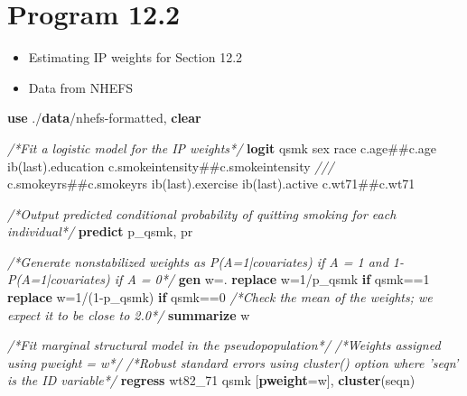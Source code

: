 \documentclass[
  10pt,
]{book}
\newenvironment{Shaded}{\begin{snugshade}}{\end{snugshade}}
\newcommand{\CommentTok}[1]{\textcolor[rgb]{0.56,0.35,0.01}{\textit{#1}}}
\newcommand{\FunctionTok}[1]{\textcolor[rgb]{0.00,0.00,0.00}{#1}}
\newcommand{\KeywordTok}[1]{\textcolor[rgb]{0.13,0.29,0.53}{\textbf{#1}}}
\newcommand{\NormalTok}[1]{#1}
\providecommand{\tightlist}{%
  \setlength{\itemsep}{0pt}\setlength{\parskip}{0pt}}
\begin{document}
\hypertarget{program-12.2}{%
\section{Program 12.2}\label{program-12.2}}

\begin{itemize}
\tightlist
\item
  Estimating IP weights for Section 12.2
\item
  Data from NHEFS
\end{itemize}

\begin{Shaded}
\begin{Highlighting}[]
\KeywordTok{use}\NormalTok{ ./}\KeywordTok{data}\NormalTok{/nhefs-formatted, }\KeywordTok{clear}

\CommentTok{/*Fit a logistic model for the IP weights*/} 
\KeywordTok{logit}\NormalTok{ qsmk sex race c.age##c.age ib(}\FunctionTok{last}\NormalTok{).education c.smokeintensity##c.smokeintensity }\CommentTok{///}
\NormalTok{c.smokeyrs##c.smokeyrs ib(}\FunctionTok{last}\NormalTok{).exercise ib(}\FunctionTok{last}\NormalTok{).active c.wt71##c.wt71 }

\CommentTok{/*Output predicted conditional probability of quitting smoking for each individual*/}
\KeywordTok{predict}\NormalTok{ p_qsmk, pr}

\CommentTok{/*Generate nonstabilized weights as P(A=1|covariates) if A = 1 and 1-P(A=1|covariates) if A = 0*/}
\KeywordTok{gen} \FunctionTok{w}\NormalTok{=.}
\KeywordTok{replace} \FunctionTok{w}\NormalTok{=1/p_qsmk }\KeywordTok{if}\NormalTok{ qsmk==1}
\KeywordTok{replace} \FunctionTok{w}\NormalTok{=1/(1-p_qsmk) }\KeywordTok{if}\NormalTok{ qsmk==0}
\CommentTok{/*Check the mean of the weights; we expect it to be close to 2.0*/}
\KeywordTok{summarize} \FunctionTok{w}

\CommentTok{/*Fit marginal structural model in the pseudopopulation*/}
\CommentTok{/*Weights assigned using pweight = w*/}
\CommentTok{/*Robust standard errors using cluster() option where 'seqn' is the ID variable*/}
\KeywordTok{regress}\NormalTok{ wt82_71 qsmk [}\KeywordTok{pweight}\NormalTok{=}\FunctionTok{w}\NormalTok{], }\KeywordTok{cluster}\NormalTok{(seqn) }
\end{Highlighting}
\end{Shaded}
\end{document}
